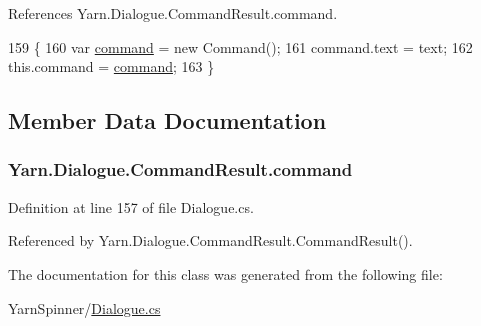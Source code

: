 References Yarn.\-Dialogue.\-Command\-Result.\-command.


\begin{DoxyCode}
159                                                \{
160                 var \hyperlink{a00054_a420ca0984d6e5c33bb761654305c592e}{command} = \textcolor{keyword}{new} Command();
161                 command.text = text;
162                 this.command = \hyperlink{a00054_a420ca0984d6e5c33bb761654305c592e}{command};
163             \}
\end{DoxyCode}


\subsection{Member Data Documentation}
\hypertarget{a00054_a420ca0984d6e5c33bb761654305c592e}{
\subsubsection[{command}]{ Yarn.\-Dialogue.\-Command\-Result.\-command}}\label{a00054_a420ca0984d6e5c33bb761654305c592e}


Definition at line 157 of file Dialogue.\-cs.



Referenced by Yarn.\-Dialogue.\-Command\-Result.\-Command\-Result().



The documentation for this class was generated from the following file\-:\begin{DoxyCompactItemize}
\item 
Yarn\-Spinner/\hyperlink{a00308}{Dialogue.\-cs}\end{DoxyCompactItemize}
